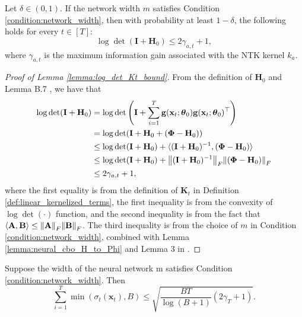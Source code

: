 \begin{lemma}
\label{lemma:neural_cbo_log_det_Kt_bound}
Let $\delta \in (0,1)$. If the network width $m$ satisfies  Condition \ref{condition:network_width}, then with probability at least $1-\delta$, the following holds for every $t \in [T]$:
\[ \log \det (\mathbf{I} + \mathbf{H}_0) \le 2\gamma_{a,t} + 1,\]
where $\gamma_{a,t}$ is the maximum information gain associated with the NTK kernel $k_a$.
\end{lemma}
\begin{proof}[Proof of Lemma \ref{lemma:log_det_Kt_bound}]

From the definition of $\mathbf{H}_0$ and Lemma B.7 \cite{zhou2020neural}, we have that
\begin{equation*}
\begin{split}
    \log \det(\mathbf{I}+ \mathbf{H}_{0})
    & = \log\det \left(\mathbf{I}+\sum_{i=1}^{T}\mathbf{g}({\mathbf{x}_t};\boldsymbol{\theta}_0)\mathbf{g}({\mathbf{x}_t};\boldsymbol{\theta}_0)^\top \right) \\
    & = \log \det(\mathbf{I}+ \mathbf{H}_0 + (\boldsymbol{\Phi} - \mathbf{H}_0))\\
    & \leq \log \det (\mathbf{I}+\mathbf{H}_0)  + \langle (\mathbf{I}+\mathbf{H}_0)^{-1}, (\boldsymbol{\Phi} - \mathbf{H}_0) \rangle \\
    & \leq \log \det (\mathbf{I}+\mathbf{H}_0)  + \norm{(\mathbf{I}+\mathbf{H}_0)^{-1}}_F \norm{ (\boldsymbol{\Phi} - \mathbf{H}_0)}_F \\
    & \leq 2 \gamma_{a,t} + 1, 
\end{split}
\end{equation*}
where the first equality is from the definition of $\mathbf{K}_t$ in Definition \ref{def:linear_kernelized_terms}, the first inequality is from the convexity of $\log \det(\cdot)$ function, and the second inequality is from the fact that $\langle \mathbf{A}, \mathbf{B} \rangle \le \norm{\mathbf{A}}_F \norm{\mathbf{B}}_F$. The third inequality is from the choice of $m$ in Condition \ref{condition:network_width}, combined with Lemma \ref{lemma:neural_cbo_H_to_Phi} and Lemma 3 in \cite{chowdhury2017kernelized}.
\end{proof}

\begin{lemma}
\label{lemma:neural_cbo_min_sigma}
Suppose the width of the neural network m satisfies Condition \ref{condition:network_width}. Then 
\begin{equation*}
    \sum_{i=1}^T \min(\sigma_t(\mathbf{x}_t),B) \leq \sqrt{\frac{ BT}{\log(B+1)} (2\gamma_T+1)}.
\end{equation*}
\end{lemma}